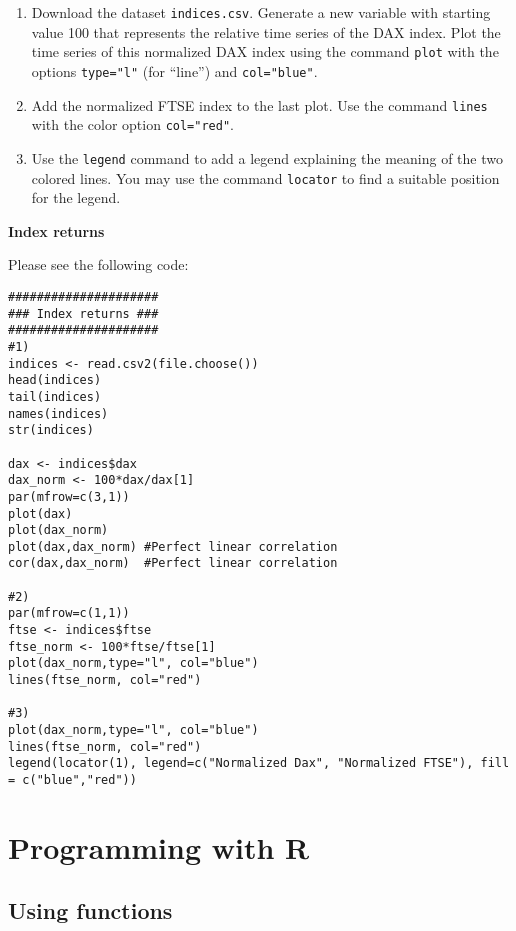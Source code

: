 \documentclass{article}
\begin{document}
\begin{enumerate}
\item Download the dataset \texttt{indices.csv}. Generate a new variable with starting value 100 that represents the relative time series of the DAX index. Plot the time series of this normalized DAX index using the command \texttt{plot} with the options \texttt{type="{}l"} (for \textquotedblleft line\textquotedblright ) and \texttt{col="blue"}.

\item Add the normalized FTSE index to the last plot. Use the command \texttt{lines} with the color option \texttt{col="{}red"}.

\item Use the \texttt{legend} command to add a legend explaining the meaning of the two colored lines. You may use the command \texttt{locator} to find a suitable position for the legend.
\end{enumerate}

\begin{solution}
\textbf{Index returns}

Please see the following code:
\begin{verbatim}
#####################
### Index returns ###
#####################
#1)
indices <- read.csv2(file.choose())
head(indices)
tail(indices)
names(indices)
str(indices)

dax <- indices$dax	
dax_norm <- 100*dax/dax[1]
par(mfrow=c(3,1))
plot(dax)
plot(dax_norm)
plot(dax,dax_norm) #Perfect linear correlation
cor(dax,dax_norm)  #Perfect linear correlation

#2)
par(mfrow=c(1,1))
ftse <- indices$ftse
ftse_norm <- 100*ftse/ftse[1]
plot(dax_norm,type="l", col="blue")
lines(ftse_norm, col="red")

#3)
plot(dax_norm,type="l", col="blue")
lines(ftse_norm, col="red")
legend(locator(1), legend=c("Normalized Dax", "Normalized FTSE"), fill = c("blue","red"))
\end{verbatim}
\end{solution}

\section{Programming with R\label{miscellaneous}}

\subsection{Using functions}
\end{document}
